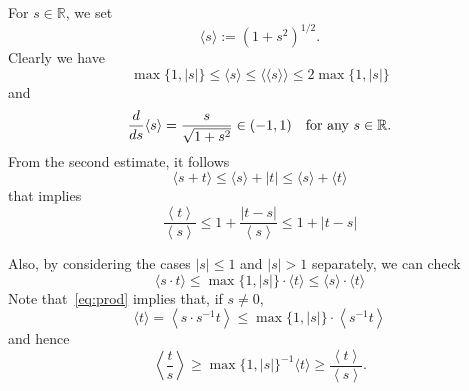 \documentclass[AHL,Unicode,longabstracts,published]{cedram}
\newcommand{\bbR}{\mathbb{R}}
\newcommand{\bbR}{\mathbb{R}}
\begin{document}
For $s\in\bbR$, we set
\[
\langle s\rangle:=(1+s^{2})^{1/2}.
\]
Clearly we have
\[
\max\{1,|s|\}\le\langle s\rangle\le\langle\langle s\rangle\rangle\le2\max\{1,|s|\}
\]
and
\[
\frac{d}{ds}\langle s\rangle=\frac{s}{\sqrt{1+s^{2}}}\in(-1,1)\quad\text{for any \ensuremath{s\in\bbR}.}
\]
From the second estimate, it follows
\begin{equation}\label{eq:sum}
\langle s+t\rangle\le\langle s\rangle+|t|\le\langle s\rangle+\langle t\rangle
\end{equation}
that implies
\begin{equation}\label{eq:D1p}
\frac{\left\langle t\right\rangle }{\left\langle s\right\rangle }\leq1+\frac{\left|t-s\right|}{\left\langle s\right\rangle }\leq1+\left|t-s\right|
\end{equation}

Also, by considering the cases $|s|\le1$ and $|s|>1$ separately, we can check
\begin{equation}\label{eq:prod}
\langle s\cdot t\rangle\le\max\{1,|s|\}\cdot\langle t\rangle\le\langle s\rangle\cdot\langle t\rangle
\end{equation}
Note that~\eqref{eq:prod} implies that, if $s\neq0$,
\[
\langle t\rangle=\left\langle s\cdot s^{-1}t\right\rangle\le\max\{1,|s|\}\cdot\left\langle s^{-1}t\right\rangle
\]
and hence
\begin{equation}\label{eq:prod2}
\left\langle\frac{t}{s}\right\rangle\ge\max\{1,|s|\}^{-1}\langle t\rangle\ge\frac{\left\langle t\right\rangle }{\left\langle s\right\rangle}.
\end{equation}




\end{document}

